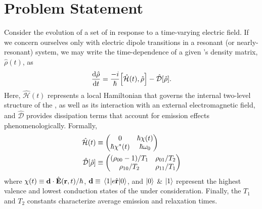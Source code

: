 \section{\label{section:problem statement}Problem Statement}
Consider the evolution of a set of \qds{} in response to a time-varying electric field.
If we concern ourselves only with electric dipole transitions in a resonant (or nearly-resonant) system, we may write the time-dependence of a given \qd's density matrix, $\hat{\rho}(t)$, as
\begin{equation}
  \dv{\hat{\rho}}{t} = \frac{-i}{\hbar}\commutator{\hat{\mathcal{H}}(t)}{\hat{\rho}} - \hat{\mathcal{D}}\qty[\hat{\rho}].
  \label{eq:liouville}
\end{equation}
Here, $\hat{\mathcal{H}}(t)$ represents a local Hamiltonian that governs the internal two-level structure of the \qd{}, as well as its interaction with an external electromagnetic field, and $\hat{\mathcal{D}}$ provides dissipation terms that account for emission effects phenomenologically.
Formally,
\begin{subequations}
  \begin{align}
    \hat{\mathcal{H}}(t) &\equiv \mqty(0 & \hbar \chi(t) \\ \hbar \chi^*(t) & \hbar \omega_0) \label{eq:hamiltonian}\\
    \hat{\mathcal{D}}\qty[\hat{\rho}] &\equiv \mqty( \qty(\rho_{00} - 1)/{T_1} & \rho_{01}/{T_2} \\ \rho_{10}/{T_2} & \rho_{11}/T_1 ) \label{eq:dissipator}
  \end{align}
\end{subequations}
where $\chi(t) \equiv \vb{d} \cdot \hat{\vb{E}}(\vb{r}, t)/\hbar$, $\vb{d} \equiv \matrixel{1}{e \hat{\vb{r}}}{0}$, and $\ket{0}$ \& $\ket{1}$ represent the highest valence and lowest conduction states of the \qd{} under consideration.
Finally, the $T_1$ and $T_2$ constants characterize average emission and relaxation times.

